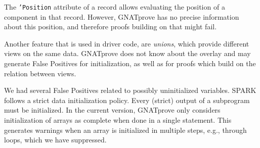 The \texttt{'Position} attribute of a record allows evaluating the
position of a component in that record.
However, GNATprove has no precise information
about this position, and therefore proofs building on that might fail.

Another feature that is used in driver code, are
\emph{unions}, which provide different views on the
same data. GNATprove does
not know about the overlay and may generate False Positives for
initialization, as well as for proofs which build on the relation
between views.


We had several False Positives related to possibly uninitialized
variables.  SPARK follows a strict data initialization policy. Every
(strict) output of a subprogram must be initialized. In the current version,
GNATprove only considers initialization of arrays as complete when done in a single
statement. This generates warnings when an array is initialized in
multiple steps, e.g., through loops, which we have suppressed.

  



